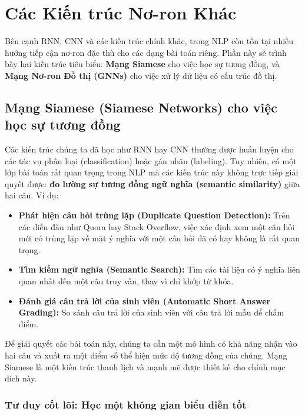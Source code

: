
\section{Các Kiến trúc Nơ-ron Khác}
\label{sec:other_nn_architectures}

Bên cạnh RNN, CNN và các kiến trúc chính khác, trong NLP còn tồn tại nhiều hướng tiếp cận nơ-ron đặc thù cho các dạng bài toán riêng. Phần này sẽ trình bày hai kiến trúc tiêu biểu: \textbf{Mạng Siamese} cho việc học sự tương đồng, và \textbf{Mạng Nơ-ron Đồ thị (GNNs)} cho việc xử lý dữ liệu có cấu trúc đồ thị.

\subsection{Mạng Siamese (Siamese Networks) cho việc học sự tương đồng}
\label{ssec:siamese_networks}

Các kiến trúc chúng ta đã học như RNN hay CNN thường được huấn luyện cho các tác vụ phân loại (classification) hoặc gán nhãn (labeling). Tuy nhiên, có một lớp bài toán rất quan trọng trong NLP mà các kiến trúc này không trực tiếp giải quyết được: \textbf{đo lường sự tương đồng ngữ nghĩa (semantic similarity)} giữa hai câu. Ví dụ:
\begin{itemize}
    \item \textbf{Phát hiện câu hỏi trùng lặp (Duplicate Question Detection):} Trên các diễn đàn như Quora hay Stack Overflow, việc xác định xem một câu hỏi mới có trùng lặp về mặt ý nghĩa với một câu hỏi đã có hay không là rất quan trọng.
    \item \textbf{Tìm kiếm ngữ nghĩa (Semantic Search):} Tìm các tài liệu có ý nghĩa liên quan nhất đến một câu truy vấn, thay vì chỉ khớp từ khóa.
    \item \textbf{Đánh giá câu trả lời của sinh viên (Automatic Short Answer Grading):} So sánh câu trả lời của sinh viên với câu trả lời mẫu để chấm điểm.
\end{itemize}

Để giải quyết các bài toán này, chúng ta cần một mô hình có khả năng nhận vào hai câu và xuất ra một điểm số thể hiện mức độ tương đồng của chúng. Mạng Siamese \cite{mueller2016siamese} là một kiến trúc thanh lịch và mạnh mẽ được thiết kế cho chính mục đích này.

\subsubsection{Tư duy cốt lõi: Học một không gian biểu diễn tốt}
\label{ssec:siamese_intuition}

